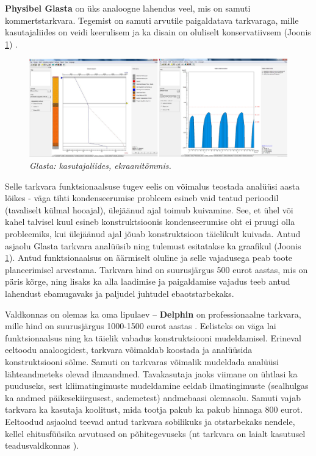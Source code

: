 \textbf{Physibel Glasta} on üks analoogne lahendus veel, mis on samuti kommertstarkvara. Tegemist on samuti arvutile paigaldatava tarkvaraga, mille
kasutajaliides on veidi keerulisem ja ka disain on oluliselt konservatiivsem (Joonis \ref{fig:glasta_sample}) \cite{glasta}. 
\begin{figure}[ht]
    \centering
    \includegraphics[width=1\textwidth]{figures/problem_statement/09_glasta_sample.png}
    \caption[Physibel Glasta tarkvara kasutajaliides, ekraanitõmmis]{\textit{Glasta: kasutajaliides, ekraanitõmmis.}}
    \label{fig:glasta_sample}
\end{figure}

Selle tarkvara funktsionaalsuse tugev eelis on võimalus teostada analüüsi aasta lõikes - väga tihti 
kondenseerumise probleem esineb vaid teatud perioodil (tavaliselt külmal hooajal),
ülejäänud ajal toimub kuivamine. See, et ühel või kahel talvisel kuul esineb konstruktsioonis kondenseerumise oht ei pruugi
olla probleemiks, kui ülejäänud ajal jõuab konstruktsioon täielikult kuivada. Antud asjaolu Glasta tarkvara analüüsib ning 
tulemust esitatakse ka graafikul (Joonis \ref{fig:glasta_sample}). Antud funktsionaalsus on äärmiselt oluline ja selle vajadusega peab toote 
planeerimisel arvestama. Tarkvara hind on suurusjärgus 500 eurot aastas, mis on päris kõrge, ning lisaks ka alla laadimise ja 
paigaldamise vajadus teeb antud lahendust ebamugavaks ja paljudel juhtudel ebaotstarbekaks.

Valdkonnas on olemas ka oma lipulaev -- \textbf{Delphin} on professionaalne tarkvara, mille hind on suurusjärgus 1000-1500 eurot aastas \cite{delphin}.
Eelisteks on väga lai funktsionaalsus ning ka täielik vabadus konstruktsiooni mudeldamisel. Erineval eeltoodu analoogidest,
tarkvara võimaldab koostada ja analüüsida konstruktsiooni sõlme. Samuti on tarkvaras võimalik mudeldada analüüsi lähteandmeteks olevad
ilmaandmed. Tavakasutaja jaoks viimane on ühtlasi ka puuduseks, sest kliimatingimuste mudeldamine eeldab ilmatingimuste 
(sealhulgas ka andmed päikesekiirgusest, sademetest) andmebaasi olemasolu. Samuti vajab tarkvara ka kasutaja koolitust, 
mida tootja pakub ka pakub hinnaga 800 eurot. Eeltoodud asjaolud teevad antud tarkvara sobilikuks ja otstarbekaks
nendele, kellel ehitusfüüsika arvutused on põhitegevuseks (nt tarkvara on laialt kasutusel teadusvaldkonnas 
\cite{rokka_hygrothermal}\cite{cukkere_hygrotherm}\cite{kohtla_koolimaja_uuring}). 

